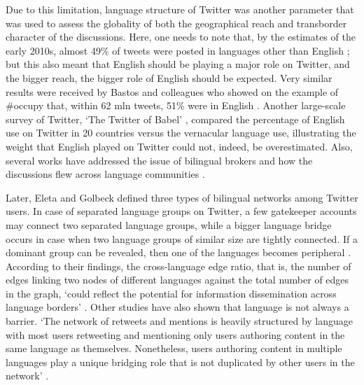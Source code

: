Due to this limitation, language structure of Twitter was another parameter that was used to assess the globality of both the geographical reach and transborder character of the discussions. Here, one needs to note that, by the estimates of the early 2010s, almost 49\% of tweets were posted in languages other than English \cite{HongConvertinoChi}; but this also meant that English should be playing a major role on Twitter, and the bigger reach, the bigger role of English should be expected. Very similar results were received by Bastos and colleagues who showed on the example of \#occupy that, within 62 mln tweets, 51\% were in English \cite[p.~165]{BastosPuschmannTravitzki}. Another large-scale survey of Twitter, ‘The Twitter of Babel’ \cite{MocanuBaronchelliPerra}, compared the percentage of English use on Twitter in 20 countries versus the vernacular language use, illustrating the weight that English played on Twitter could not, indeed, be overestimated. Also, several works have addressed the issue of bilingual brokers and how the discussions flew across language communities \cite{HongConvertinoChi}.

Later, Eleta and Golbeck \cite{EletaGolbeck} defined three types of bilingual networks among Twitter users. In case of separated language groups on Twitter, a few gatekeeper accounts may connect two separated language groups, while a bigger language bridge occurs in case when two language groups of similar size are tightly connected. If a dominant group can be revealed, then one of the languages becomes peripheral \cite{EletaGolbeck}. According to their findings, the cross-language edge ratio, that is, the number of edges linking two nodes of different languages against the total number of edges in the graph, ‘could reflect the potential for information dissemination across language borders’ \cite{EletaGolbeck}. Other studies have also shown that language is not always a barrier. ‘The network of retweets and mentions is heavily structured by language with most users retweeting and mentioning only users authoring content in the same language as themselves. Nonetheless, users authoring content in multiple languages play a unique bridging role that is not duplicated by other users in the network’ \cite{Hale2014}.

